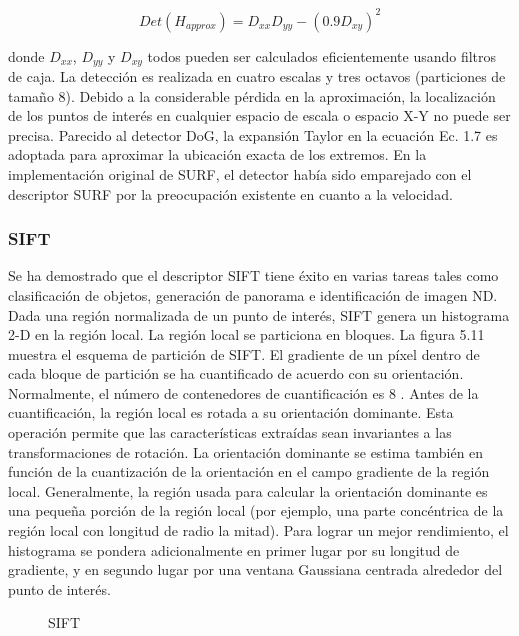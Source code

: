 \[
Det(H_{approx}) = D_{xx}D_{yy} - (0.9D_{xy})^{2}
\]

donde $D_{xx}$, $D_{yy}$ y $D_{xy}$ todos pueden ser calculados eficientemente usando filtros de caja. La detección es realizada en cuatro escalas y tres octavos (particiones de tamaño 8). Debido a la considerable pérdida en la aproximación, la localización de los puntos de interés en cualquier espacio de escala o espacio X-Y no puede ser precisa. Parecido al detector DoG, la expansión Taylor en la ecuación Ec. 1.7 es adoptada para aproximar la ubicación exacta de los extremos. En la implementación original de SURF, el detector había sido emparejado con el descriptor SURF por la preocupación existente en cuanto a la velocidad. \\

\subsubsection{SIFT}
Se ha demostrado que el descriptor SIFT tiene éxito en varias tareas tales como clasificación de objetos, generación de panorama e identificación de imagen ND. Dada una región normalizada de un punto de interés, SIFT genera un histograma 2-D en la región local. La región local se particiona en bloques. La figura 5.11 muestra el esquema de partición de SIFT. El gradiente de un píxel dentro de cada bloque de partición se ha cuantificado de acuerdo con su orientación. Normalmente, el número de contenedores de cuantificación es 8 \cite{Reference28}. Antes de la cuantificación, la región local es rotada a su orientación dominante. Esta operación permite que las características extraídas sean invariantes a las transformaciones de rotación. La orientación dominante se estima también en función de la cuantización de la orientación en el campo gradiente de la región local. Generalmente, la región usada para calcular la orientación dominante es una pequeña porción de la región local (por ejemplo, una parte concéntrica de la región local con longitud de radio la mitad). Para lograr un mejor rendimiento, el histograma se pondera adicionalmente en primer lugar	 por su longitud de gradiente, y en segundo lugar por una ventana Gaussiana centrada alrededor del punto de interés. \\

\begin{figure}[htbp]
\centering
{}
\caption{SIFT} \label{fig:señales}
\end{figure}


